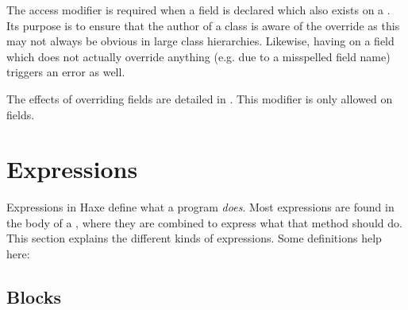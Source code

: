 \documentclass{haxe}
\begin{document}
The access modifier  is required when a field is declared which also exists on a . Its purpose is to ensure that the author of a class is aware of the override as this may not always be obvious in large class hierarchies. Likewise, having  on a field which does not actually override anything (e.g. due to a misspelled field name) triggers an error as well.

The effects of overriding fields are detailed in . This modifier is only allowed on  fields.




\chapter{Expressions}
\label{expression}

Expressions in Haxe define what a program \emph{does}. Most expressions are found in the body of a , where they are combined to express what that method should do. This section explains the different kinds of expressions. Some definitions help here:




\section{Blocks}
\label{expression-block}
\end{document}
